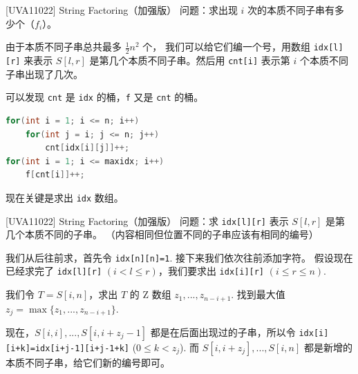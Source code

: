 \documentclass{beamer}
\begin{document}
\begin{frame}[fragile]{[UVA11022] String Factoring（加强版）}
    \small
    问题：求出现 $i$ 次的本质不同子串有多少个（$f_i$）。

    \vspace{1em}\pause
    由于本质不同子串总共最多 $\frac{1}{2}n^2$ 个，
    我们可以给它们编一个号，用数组 \verb|idx[l][r]| 来表示 $S[l,r]$
    是第几个本质不同子串。然后用 \verb|cnt[i]| 
    表示第 $i$ 个本质不同子串出现了几次。

    \vspace{1em}\pause
    可以发现 \verb|cnt| 是 \verb|idx| 的桶，\verb|f| 又是 \verb|cnt| 的桶。

    \begin{lstlisting}[language=c++]
for(int i = 1; i <= n; i++)
    for(int j = i; j <= n; j++)
        cnt[idx[i][j]]++;
for(int i = 1; i <= maxidx; i++)
    f[cnt[i]]++;
    \end{lstlisting}

    现在关键是求出 \verb|idx| 数组。
\end{frame}

\begin{frame}[fragile]{[UVA11022] String Factoring（加强版）}
    \small
    问题：求 \verb|idx[l][r]| 表示 $S[l,r]$ 是第几个本质不同的子串。
    （内容相同但位置不同的子串应该有相同的编号）

    \vspace{1em}\pause
    我们从后往前求，首先令 \verb|idx[n][n]=1|. 接下来我们依次往前添加字符。
    \pause 假设现在已经求完了 \verb|idx[l][r]| $(i<l\leq r)$，我们要求出 \verb|idx[i][r]| $(i\leq r\leq n)$.

    \vspace{1em}\pause
    我们令 $T=S[i,n]$，求出 $T$ 的 Z 数组 $z_1,...,z_{n-i+1}$. 找到最大值 $z_j=\max\{z_1,...,z_{n-i+1}\}$.

    \vspace{1em}\pause
    现在，$S[i,i],...,S[i,i+z_j-1]$ 都是在后面出现过的子串，所以令 \verb|idx[i][i+k]=idx[i+j-1][i+j-1+k]| ($0\leq k < z_j$).
    \vspace{.5em}
    而 $S[i,i+z_j],...,S[i,n]$ 都是新增的本质不同子串，给它们新的编号即可。
\end{frame}
\end{document}
